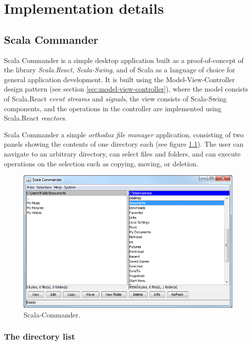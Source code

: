 
\chapter{Implementation details}\label{chap:implementation-details}

\section{Scala Commander}

Scala Commander is a simple desktop application built as a proof-of-concept of the library \emph{Scala.React}, \emph{Scala-Swing}, and of Scala as a language of choice for general application development. It is built using the Model-View-Controller design pattern (see section \ref{sec:model-view-controller}), where the model consists of Scala.React \emph{event streams} and \emph{signals}, the view consists of Scala-Swing components, and the operations in the controller are implemented using Scala.React \emph{reactors}.

Scala Commander a simple \emph{orthodox file manager} application, consisting of two panels showing the contents of one directory each (see figure \ref{fig:scomm_main}). The user can navigate to an arbitrary directory, can select files and folders, and can execute operations on the selection such as copying, moving, or deletion.



\begin{figure}[h!] 
  \centering
    \includegraphics[width=1\textwidth]{images/scala-commander-main.png}
  \caption{Scala-Commander.}
  \label{fig:scomm_main}  
\end{figure}

\subsection{The directory list}

